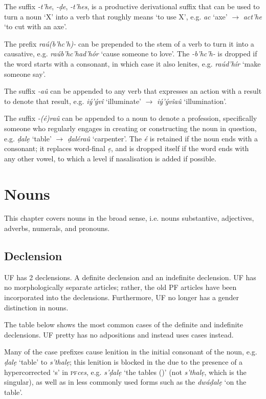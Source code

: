 \documentclass[a4paper, 12pt, twoside, final]{article}
\def\pfabbr{{\normalfont\scshape pf\space}}
\def\pf#1{\pfabbr\textit{#1}}
\let \w \textit
\begin{document}
The suffix \w{-t’he},  \w{-ḍe},  \w{-t’hes}, is a productive derivational suffix that can be used to turn a
noun ‘X’ into a verb that roughly means ‘to use X’, e.g. \w{ac} ‘axe’ $\to$ \w{act’he} ‘to cut with an axe’.

The prefix \w{raú(b’hc’h)-} can be prepended to the stem of a verb to turn it into a causative, e.g. \w{raúb’hc’had’hór}
‘cause someone to love’. The \w{-b’hc’h-} is dropped if the word starts with a consonant, in which case it also
lenites, e.g. \w{raúd’hír} ‘make someone say’.

The suffix \w{-aû} can be appended to any verb that expresses an action with a result to denote that result, e.g.
\w{iý’ývî} ‘illuminate’ $\to$ \w{iý’ývîaû} ‘illumination’.

The suffix \w{-(é)raû} can be appended to a noun to denote a profession, specifically someone who regularly engages in
creating or constructing the noun in question, e.g. \w{ḍalẹ} ‘table’ $\to$ \w{ḍaléraû} ‘carpenter’. The \w{é} is retained
if the noun ends with a consonant; it replaces word-final \w{ẹ}, and is dropped itself if the word ends with any other vowel,
to which a level if nasalisation is added if possible.

\section{Nouns}\label{sec:accidence}
This chapter covers nouns in the broad sense, i.e. nouns substantive, adjectives, adverbs, numerals, and pronouns.

\subsection{Declension}\label{subsubsec:declension}
UF has 2 declensions. A definite declension and an indefinite declension.
UF has no morphologically separate articles; rather, the old PF articles have been incorporated
into the declensions. Furthermore, UF no longer has a gender distinction in nouns.

The table below shows the most common cases of the definite and indefinite declensions. UF pretty has no
adpositions and instead uses cases instead.

Many of the case prefixes cause lenition in the initial consonant of the noun, e.g. \w{ḍalẹ} ‘table’ to
 \w{s’thalẹ}; this lenition is blocked in the  due to the presence of a hypercorrected ‘s’
in \pf{ces}, e.g. \w{s’ḍalẹ} ‘the tables ()’ (not \w{s’thalẹ}, which is the singular), as well as in
less commonly used forms such as the  \w{dwáḍalẹ} ‘on the table’.
\end{document}
